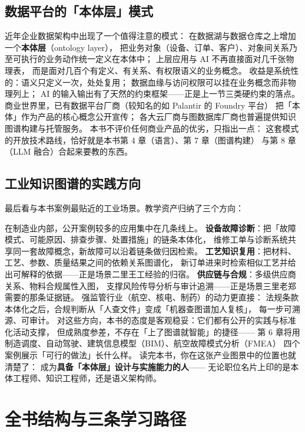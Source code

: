 \subsection{数据平台的「本体层」模式}

近年企业数据架构中出现了一个值得注意的模式：
在数据湖与数据仓库之上增加一个\textbf{本体层}（ontology layer），
把业务对象（设备、订单、客户）、对象间关系乃至可执行的业务动作统一定义在本体中；
上层应用与 AI 不再直接面对几千张物理表，
而是面对几百个有定义、有关系、有权限语义的业务概念。
收益是系统性的：语义只定义一次，处处复用；
数据血缘与访问权限可以挂在业务概念而非物理列上；
AI 的输入输出有了天然的约束框架——正是上一节三类硬约束的落点。
商业世界里，已有数据平台厂商（较知名的如 Palantir 的 Foundry 平台）
把「本体」作为产品的核心概念公开宣传；
各大云厂商与图数据库厂商也普遍提供知识图谱构建与托管服务。
本书不评价任何商业产品的优劣，只指出一点：
这套模式的开放技术路线，恰好就是本书第 4 章（语言）、第 7 章（图谱构建）
与第 8 章（LLM 融合）合起来要教的东西。

\subsection{工业知识图谱的实践方向}

最后看与本书案例最贴近的工业场景。教学资产归纳了三个方向：



在制造业内部，公开案例较多的应用集中在几条线上。
\textbf{设备故障诊断}：把「故障模式、可能原因、排查步骤、处置措施」的链条本体化，
维修工单与诊断系统共享同一套故障概念，新故障可以沿着链条做归因检索。
\textbf{工艺知识复用}：把材料、工艺、参数、质量结果之间的依赖关系图谱化，
新订单进来时检索相似工艺并给出可解释的依据——正是场景二里王工经验的归宿。
\textbf{供应链与合规}：多级供应商关系、物料合规属性入图，
支撑风险传导分析与审计追溯——正是场景三里老郑需要的那条证据链。
强监管行业（航空、核电、制药）的动力更直接：
法规条款本体化之后，合规判断从「人查文件」变成「机器查图谱加人复核」，
每一步可溯源、可审计。
对这些方向，本书的态度是客观稳妥：它们都有公开的实践与标准化活动支撑，
但成熟度参差，不存在「上了图谱就智能」的捷径——
第 6 章将用制造调度、自动驾驶、建筑信息模型（BIM）、航空故障模式分析（FMEA）
四个案例展示「可行的做法」长什么样。
读完本书，你在这张产业图景中的位置也就清楚了：
成为\textbf{具备「本体层」设计与实施能力的人}——
无论职位名片上印的是本体工程师、知识工程师，还是语义架构师。

\section{全书结构与三条学习路径}

